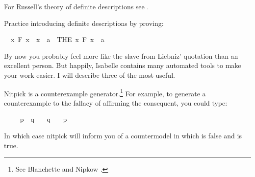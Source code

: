 \begin{isabellebody}
\begin{isamarkuptext}
{For Russell's theory of definite descriptions see \cite{russell_denoting_1905}.}%
\end{isamarkuptext}\isamarkuptrue%
%
\begin{isamarkuptext}%
\begin{Exercise} Practice introducing definite descriptions by proving: \end{Exercise}%
\end{isamarkuptext}\isamarkuptrue%
\isamarkupfalse%
\ {\isachardoublequoteopen}{\isacharparenleft}{\isasymforall}\ x{\isachardot}\ F\ x\ {\isasymlongleftrightarrow}\ x\ {\isacharequal}\ a{\isacharparenright}\ {\isasymlongrightarrow}\ {\isacharparenleft}THE\ x{\isachardot}\ F\ x{\isacharparenright}\ {\isacharequal}\ a{\isachardoublequoteclose}%
\isadelimproof
\ %
\endisadelimproof
%
\isatagproof
{}\isamarkupfalse%
%
\endisatagproof
{\isafoldproof}%
%
\isadelimproof
%
\endisadelimproof
%
\isamarkuptrue%
%
\begin{isamarkuptext}%
By now you probably feel more like the slave from Liebniz' quotation than an excellent person.
But happily, Isabelle contains many automated tools to make your work easier. I will describe three of
the most useful.%
\end{isamarkuptext}\isamarkuptrue%
%
\isamarkuptrue%
%
\begin{isamarkuptext}%
Nitpick is a counterexample generator.\footnote{See Blanchette and Nipkow \cite{blanchette_nitpick_2010}.} 
For example, to generate a counterexample to the fallacy of affirming the consequent, you could type:%
\end{isamarkuptext}\isamarkuptrue%
\isamarkupfalse%
\ \isanewline
\ \ \ {\isachardoublequoteopen}p\ {\isasymlongrightarrow}\ q{\isachardoublequoteclose}\isanewline
\ \ \ {\isachardoublequoteopen}q{\isachardoublequoteclose}\isanewline
\ \ \ {\isachardoublequoteopen}p{\isachardoublequoteclose}\ \isamarkupfalse%
%
\isadelimproof
\ %
\endisadelimproof
%
\isatagproof
{}\isamarkupfalse%
%
\endisatagproof
{\isafoldproof}%
%
\isadelimproof
%
\endisadelimproof
%
\begin{isamarkuptext}%
In which case nitpick will inform you of a countermodel in which   is false and 
 is true.%
\end{isamarkuptext}\isamarkuptrue%
%
\isamarkuptrue%
%
\begin{isamarkuptext}%

\end{isamarkuptext}
\end{isabellebody}
